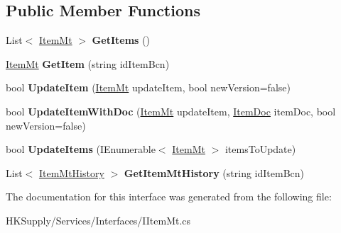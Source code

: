 \subsection*{Public Member Functions}
\begin{DoxyCompactItemize}
\item 
\mbox{\label{interface_h_k_supply_1_1_services_1_1_interfaces_1_1_i_item_mt_a61763eb7aa318c90f7ee69b0083324b4}} 
List$<$ \mbox{\hyperlink{class_h_k_supply_1_1_models_1_1_item_mt}{Item\+Mt}} $>$ {\bfseries Get\+Items} ()
\item 
\mbox{\label{interface_h_k_supply_1_1_services_1_1_interfaces_1_1_i_item_mt_a3e3a42f39e1ccbbb0cae9710d93a0860}} 
\mbox{\hyperlink{class_h_k_supply_1_1_models_1_1_item_mt}{Item\+Mt}} {\bfseries Get\+Item} (string id\+Item\+Bcn)
\item 
\mbox{\label{interface_h_k_supply_1_1_services_1_1_interfaces_1_1_i_item_mt_afb3f543216e725a8c0d8fdb962c71ffd}} 
bool {\bfseries Update\+Item} (\mbox{\hyperlink{class_h_k_supply_1_1_models_1_1_item_mt}{Item\+Mt}} update\+Item, bool new\+Version=false)
\item 
\mbox{\label{interface_h_k_supply_1_1_services_1_1_interfaces_1_1_i_item_mt_a0652eecc6bd92dafcb2773072897ecb3}} 
bool {\bfseries Update\+Item\+With\+Doc} (\mbox{\hyperlink{class_h_k_supply_1_1_models_1_1_item_mt}{Item\+Mt}} update\+Item, \mbox{\hyperlink{class_h_k_supply_1_1_models_1_1_item_doc}{Item\+Doc}} item\+Doc, bool new\+Version=false)
\item 
\mbox{\label{interface_h_k_supply_1_1_services_1_1_interfaces_1_1_i_item_mt_a3213f18dda65cdb93c85eeaed75baa95}} 
bool {\bfseries Update\+Items} (I\+Enumerable$<$ \mbox{\hyperlink{class_h_k_supply_1_1_models_1_1_item_mt}{Item\+Mt}} $>$ items\+To\+Update)
\item 
\mbox{\label{interface_h_k_supply_1_1_services_1_1_interfaces_1_1_i_item_mt_aed208a354cb69df853887e44466f319b}} 
List$<$ \mbox{\hyperlink{class_h_k_supply_1_1_models_1_1_item_mt_history}{Item\+Mt\+History}} $>$ {\bfseries Get\+Item\+Mt\+History} (string id\+Item\+Bcn)
\end{DoxyCompactItemize}


The documentation for this interface was generated from the following file\+:\begin{DoxyCompactItemize}
\item 
H\+K\+Supply/\+Services/\+Interfaces/I\+Item\+Mt.\+cs\end{DoxyCompactItemize}
